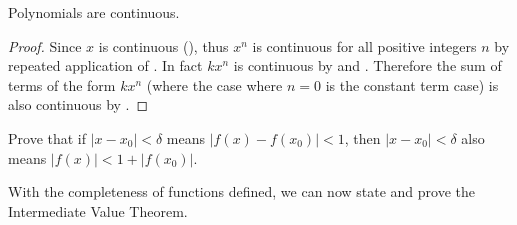 \begin{proposition}\label{prop-polynomials-are-continuous}
    Polynomials are continuous.
\end{proposition}
\begin{proof}
    Since $x$ is continuous (), thus $x^n$ is continuous for all positive integers $n$ by repeated application of . In fact $kx^n$ is continuous by  and . Therefore the sum of terms of the form $kx^n$ (where the case where $n = 0$ is the constant term case) is also continuous by .
\end{proof}

\begin{exercise}\label{exercise-product-of-continuous-functions-is-continuous-exercise}
    Prove that if $|x - x_0| < \delta$ means $|f(x) - f(x_0)| < 1$, then $|x - x_0| < \delta$ also means $|f(x)| < 1 + |f(x_0)|$.
\end{exercise}

With the completeness of functions defined, we can now state and prove the Intermediate Value Theorem.

